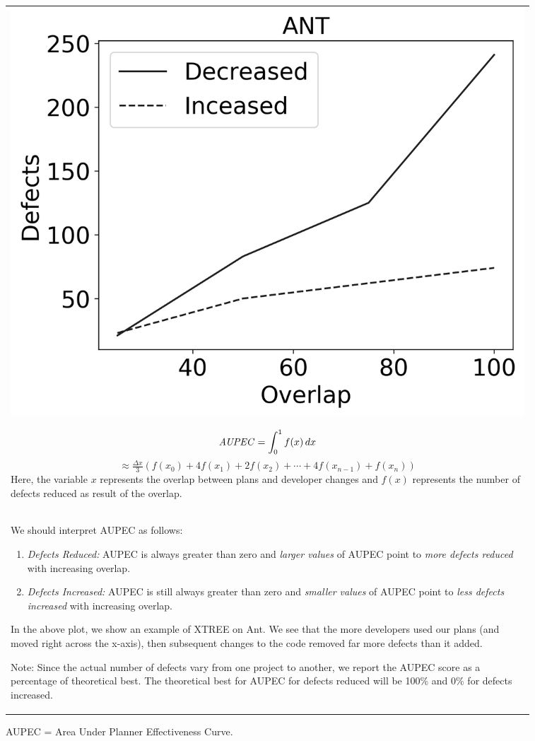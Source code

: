 \begin{figure}[t!]
\small
\centering
\begin{tabular}{|p{0.95\linewidth}|} \hline
\begin{center}
    \includegraphics[width=0.7\linewidth]{images/sample_ant.png}
\end{center}
\[
\mathit{AUPEC} = \int_{0}^{1} f(x) \, dx \hfill
\]
\[\approx \tfrac{\Delta x}{3}\left(f(x_0) + 4f(x_1)+2f(x_2)+\cdots+4f(x_{n-1}) + f(x_{n})\right)
\]
Here, the variable $x$ represents the overlap between plans and developer changes
and  $f(x)$ represents the number of defects reduced as result of the overlap.\\

We should interpret AUPEC as follows:
\begin{enumerate}
    \item \textit{Defects Reduced:}
  AUPEC is always greater than zero and 
    \textit{larger values} of AUPEC point to \textit{more defects reduced} with increasing overlap.
    
        \item \textit{Defects Increased:}  AUPEC is still always greater than zero
        and \textit{smaller values} of AUPEC point to \textit{less defects increased} with increasing overlap.
   
\end{enumerate}
In the above plot, we show an example of XTREE on Ant. We see that the more developers used our plans (and moved right across the x-axis), then subsequent changes to the code removed far more defects than it added.  

Note: Since the actual number of defects vary from one project to another, we report the AUPEC score as a percentage of theoretical best. The theoretical best for AUPEC for defects reduced will be 100\% and 0\% for defects increased.
 
\\\hline
\end{tabular}
\caption{ AUPEC = Area Under Planner Effectiveness Curve.}
\label{fig:report_sample}
\end{figure}